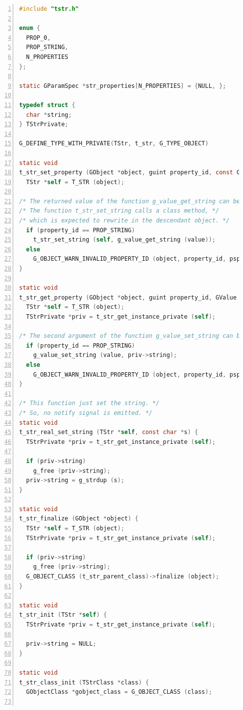 \begin{lstlisting}[language=C, numbers=left]
#include "tstr.h"

enum {
  PROP_0,
  PROP_STRING,
  N_PROPERTIES
};

static GParamSpec *str_properties[N_PROPERTIES] = {NULL, };

typedef struct {
  char *string;
} TStrPrivate;

G_DEFINE_TYPE_WITH_PRIVATE(TStr, t_str, G_TYPE_OBJECT)

static void
t_str_set_property (GObject *object, guint property_id, const GValue *value, GParamSpec *pspec) {
  TStr *self = T_STR (object);

/* The returned value of the function g_value_get_string can be NULL. */
/* The function t_str_set_string calls a class method, */
/* which is expected to rewrite in the descendant object. */
  if (property_id == PROP_STRING)
    t_str_set_string (self, g_value_get_string (value));
  else
    G_OBJECT_WARN_INVALID_PROPERTY_ID (object, property_id, pspec);
}

static void
t_str_get_property (GObject *object, guint property_id, GValue *value, GParamSpec *pspec) {
  TStr *self = T_STR (object);
  TStrPrivate *priv = t_str_get_instance_private (self);

/* The second argument of the function g_value_set_string can be NULL. */
  if (property_id == PROP_STRING)
    g_value_set_string (value, priv->string);
  else
    G_OBJECT_WARN_INVALID_PROPERTY_ID (object, property_id, pspec);
}

/* This function just set the string. */
/* So, no notify signal is emitted. */
static void
t_str_real_set_string (TStr *self, const char *s) {
  TStrPrivate *priv = t_str_get_instance_private (self);

  if (priv->string)
    g_free (priv->string);
  priv->string = g_strdup (s);
}

static void
t_str_finalize (GObject *object) {
  TStr *self = T_STR (object);
  TStrPrivate *priv = t_str_get_instance_private (self);

  if (priv->string)
    g_free (priv->string);
  G_OBJECT_CLASS (t_str_parent_class)->finalize (object);
}

static void
t_str_init (TStr *self) {
  TStrPrivate *priv = t_str_get_instance_private (self);

  priv->string = NULL;
}

static void
t_str_class_init (TStrClass *class) {
  GObjectClass *gobject_class = G_OBJECT_CLASS (class);


\end{lstlisting}

